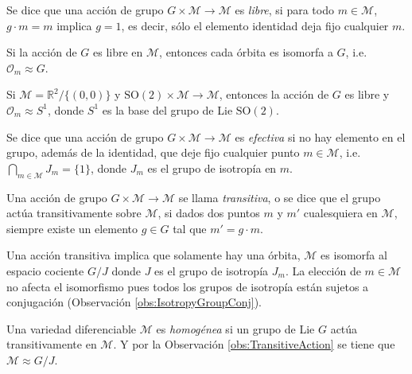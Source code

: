 \begin{mydef}
Se dice que una acci\'{o}n de grupo $G \times \mathcal{M} \longrightarrow \mathcal{M}$ es \emph{libre}, si para todo $m \in \mathcal{M}$, $g \cdot m = m$ implica $g = 1$, es decir, s\'{o}lo el elemento identidad deja fijo cualquier $m$.
\end{mydef}

\begin{obs}
Si la acci\'{o}n de $G$ es libre en $\mathcal{M}$, entonces cada \'{o}rbita es isomorfa a $G$, i.e. $\mathcal{O}_{m} \approx G$.
%
\begin{ex}
Si $\mathcal{M} = \mathbb{R}^{2}/\{(0,0)\}$ y $\mathrm{SO}(2) \times \mathcal{M} \rightarrow \mathcal{M}$, entonces la acci\'{o}n de $G$ es libre y $\mathcal{O}_{m} \approx S^{1}$, donde $S^{1}$ es la base del grupo de Lie $\mathrm{SO}(2)$.
\end{ex}
\end{obs}

\begin{mydef}
Se dice que una acci\'{o}n de grupo $G \times \mathcal{M} \longrightarrow \mathcal{M}$ es \emph{efectiva} si no hay elemento en el grupo, adem\'{a}s de la identidad, que deje fijo cualquier punto $m \in \mathcal{M}$, i.e. $\bigcap\limits_{m \in \mathcal{M}} J_{m} = \{1\}$, donde $J_{m}$ es el grupo de isotrop\'{i}a en $m$.
\end{mydef}

\begin{mydef}
Una acci\'{o}n de grupo $G \times \mathcal{M} \longrightarrow \mathcal{M}$ se llama \emph{transitiva}, o se dice que el grupo act\'{u}a transitivamente sobre $\mathcal{M}$, si dados dos puntos $m$ y $m'$ cualesquiera en $\mathcal{M}$, siempre existe un elemento $g \in G$ tal que $m' = g \cdot m$.
\end{mydef}

\begin{obs}
\label{obs:TransitiveAction}
Una acci\'{o}n transitiva implica que solamente hay una \'{o}rbita, $\mathcal{M}$ es isomorfa al espacio cociente $G/J$ donde $J$ es el grupo de isotrop\'{i}a $J_{m}$. La elecci\'{o}n de $m \in \mathcal{M}$ no afecta el isomorfismo pues todos los grupos de isotrop\'{i}a est\'{a}n sujetos a conjugaci\'{o}n (Observaci\'{o}n \ref{obs:IsotropyGroupConj}).
\end{obs}

\begin{mydef}
Una variedad diferenciable $\mathcal{M}$ es \emph{homog\'{e}nea} si un grupo de Lie $G$ act\'{u}a transitivamente en $\mathcal{M}$. Y por la Observaci\'{o}n \ref{obs:TransitiveAction} se tiene que $\mathcal{M} \approx G/J$.
\end{mydef}

